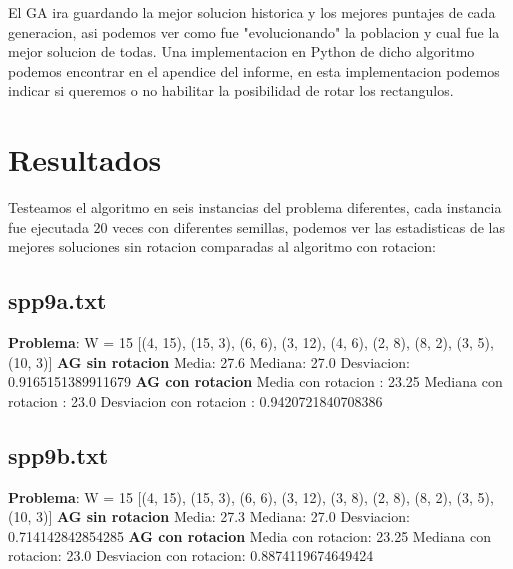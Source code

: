 \documentclass[10pt]{article}
\begin{document}
El GA ira guardando la mejor solucion historica y los mejores puntajes de cada generacion, asi podemos ver como fue "evolucionando" la poblacion y cual fue la mejor solucion de todas. Una implementacion en Python de dicho algoritmo podemos encontrar en el apendice del informe, en esta implementacion podemos indicar si queremos o no habilitar la posibilidad de rotar los rectangulos.

\section{Resultados} %
 
Testeamos el algoritmo en seis instancias del problema diferentes, cada instancia fue ejecutada $20$ veces con diferentes semillas, podemos ver las estadisticas de las mejores soluciones sin rotacion comparadas al algoritmo con rotacion:

\subsection*{spp9a.txt}
\noindent \textbf{Problema}: W = 15 [(4, 15), (15, 3), (6, 6), (3, 12), (4, 6), (2, 8), (8, 2), (3, 5), (10, 3)]\newline
\newline
\textbf{AG sin rotacion}\newline
Media: 27.6\newline
Mediana: 27.0\newline
Desviacion: 0.9165151389911679\newline
\newline
\textbf{AG con rotacion}\newline
Media con rotacion : 23.25\newline
Mediana con rotacion : 23.0\newline
Desviacion con rotacion : 0.9420721840708386
\subsection*{spp9b.txt}
\noindent \textbf{Problema}: W = 15 [(4, 15), (15, 3), (6, 6), (3, 12), (3, 8), (2, 8), (8, 2), (3, 5), (10, 3)]\newline
\newline
\textbf{AG sin rotacion}\newline
Media: 27.3\newline
Mediana: 27.0\newline
Desviacion: 0.714142842854285\newline
\newline
\textbf{AG con rotacion}\newline
Media con rotacion: 23.25\newline
Mediana con rotacion: 23.0\newline
Desviacion con rotacion: 0.8874119674649424
\end{document}
